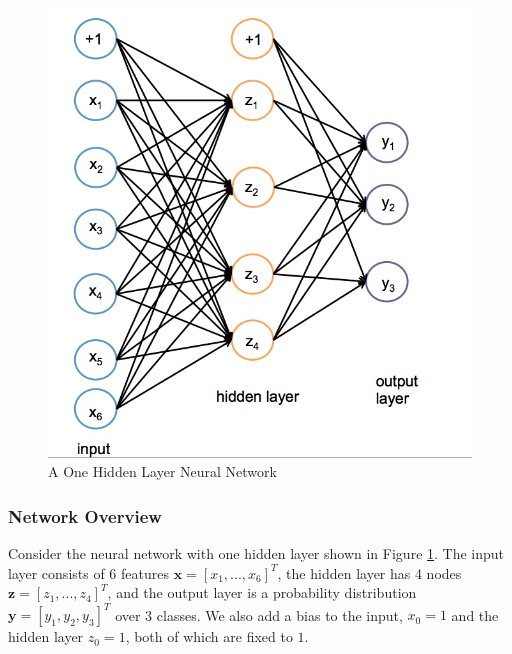 \documentclass{article}
\newcommand{\xv}{\mathbf{x}}
\newcommand{\yv}{\mathbf{y}}
\newcommand{\zv}{\mathbf{z}}
\theoremstyle{definition}
\theoremstyle{remark}
\newenvironment{Q_nosol}
{%
\clearpage
\item
}
{%
\phantom{s} %
\bigskip
}
\begin{document}
\begin{enumerate}[font={\Large\bfseries},left=0pt]
\begin{Q_nosol}
 \begin{figure}[h]
        \centering
        \includegraphics[trim=0 0.2mm 0  0, clip, scale=0.7]{figures/oneHL6.png}
        \caption{A One Hidden Layer Neural Network}
        \label{fig:oneHL}
    \end{figure}

\subsubsection*{\textbf{Network Overview}}
Consider the neural network with one hidden layer shown in Figure \ref{fig:oneHL}. The input layer consists of 6 features $\xv = [x_1,...,x_6]^T$, the hidden layer has 4  nodes $\zv = [z_1,...,z_4]^T$, and the output layer is a probability distribution $\yv = [y_1, y_2, y_3]^T$ over 3 classes. We also add a bias to the input, $x_0 = 1$ and the hidden layer $z_0 = 1$, both of which are fixed to $1$.



\end{Q_nosol}
\end{enumerate}
\end{document}
